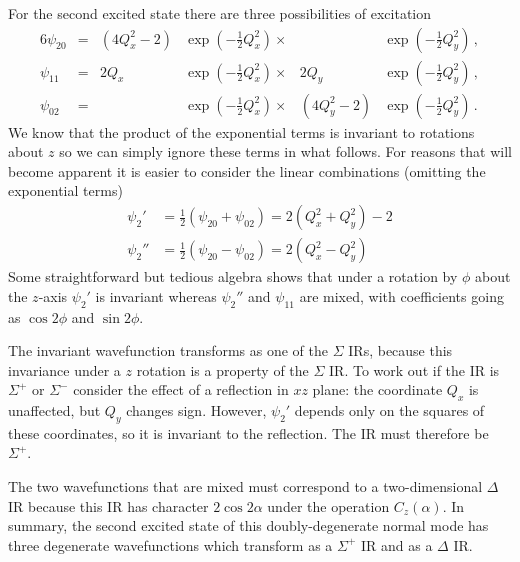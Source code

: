 \documentclass{article}
\theoremstyle{plain}\theoremheaderfont{\normalfont\itshape}\theorembodyfont{\rmfamily}\theoremseparator{.}\newtheorem*{rem}{Remark}\newtheorem*{ex}{Example}\newtheorem*{proof}{Proof}\newtheorem*{altp}{Alternative proof}
\theoremstyle{plain}\theoremheaderfont{\normalfont\bfseries}\theorembodyfont{\rmfamily}\theoremseparator{.}\newtheorem{thm}{Theorem}[section]\newtheorem{lem}[thm]{Lemma}\newtheorem{prop}[thm]{Proposition}\newtheorem*{cor}{Corollary}\newtheorem{defn}[thm]{Definition}\newtheorem{clm}[thm]{Claim}\newtheorem{clminproof}{Claim}\newtheorem{pos}{Postulate}[section]
\theoremstyle{break}\theoremheaderfont{\normalfont\itshape}\theorembodyfont{\rmfamily}\theoremseparator{.\medskip}\newtheorem*{proofskip}{Proof}\newtheorem*{exs}{Examples}\newtheorem*{rems}{Remarks}
\theoremstyle{break}\theoremheaderfont{\normalfont\bfseries}\theorembodyfont{\rmfamily}\theoremseparator{.\medskip}\newtheorem{lemskip}[thm]{Lemma}\newtheorem{defnskip}[thm]{Definition}\newtheorem{propskip}[thm]{Proposition}\newtheorem{thmskip}[thm]{Theorem}
\numberwithin{equation}{section}
\begin{document}
    For the second excited state there are three possibilities of excitation
    \begin{alignat}{6}
        \psi_{20} &=& (4Q_x^2-2) &\exp\left(-\frac{1}{2}Q_x^2\right)\times&&\exp\left(-\frac{1}{2}Q_y^2\right)\,,\\
        \psi_{11} &=& 2Q_x &\exp\left(-\frac{1}{2}Q_x^2\right)\times&2Q_y&\exp\left(-\frac{1}{2}Q_y^2\right)\,,\\
        \psi_{02} &=& &\exp\left(-\frac{1}{2}Q_x^2\right)\times&(4Q_y^2-2)&\exp\left(-\frac{1}{2}Q_y^2\right)\,.
    \end{alignat}
    We know that the product of the exponential terms is invariant to rotations about \(z\) so we can simply ignore these terms in what follows. For reasons that will become apparent it is easier to consider the linear combinations (omitting the exponential terms)
    \begin{align}
        \psi_2'&=\frac{1}{2}(\psi_{20}+\psi_{02})=2(Q_x^2+Q_y^2)-2\\
        \psi_2''&=\frac{1}{2}(\psi_{20}-\psi_{02})=2(Q_x^2-Q_y^2)
    \end{align}
    Some straightforward but tedious algebra shows that under a rotation by \(\phi\) about the \(z\)-axis \(\psi_2'\) is invariant whereas \(\psi_2''\) and \(\psi_{11}\) are mixed, with coefficients going as \(\cos 2\phi\) and \(\sin 2\phi\).

    The invariant wavefunction transforms as one of the \(\Sigma\) IRs, because this invariance under a \(z\) rotation is a property of the \(\Sigma\) IR. To work out if the IR is \(\Sigma^+\) or \(\Sigma^-\) consider the effect of a reflection in \(xz\) plane: the coordinate \(Q_x\) is unaffected, but \(Q_y\) changes sign. However, \(\psi_2'\) depends only on the squares of these coordinates, so it is invariant to the reflection. The IR must therefore be \(\Sigma^+\).

    The two wavefunctions that are mixed must correspond to a two-dimensional \(\Delta\) IR because this IR has character \(2\cos 2\alpha\) under the operation \(C_z(\alpha)\). In summary, the second excited state of this doubly-degenerate normal mode has three degenerate wavefunctions which transform as a \(\Sigma^+\) IR and as a \(\Delta\) IR.
\end{document}
